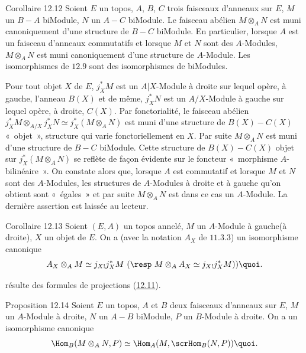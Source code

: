 \documentclass[10pt]{../fichiers-configuration-latex/smfart}
\begin{document}
\begin{enonce*}{Corollaire 12.12}
Soient $E$ un topos, $A$, $B$, $C$ trois faisceaux d'anneaux sur
$E$, $M$ un $B-A$ biModule, $N$ un $A-C$ biModule. Le faisceau
abélien $M\otimes_A N$ est muni canoniquement d'une structure de
$B-C$ biModule. En particulier, lorsque $A$ est un faisceau
d'anneaux commutatifs et lorsque $M$ et $N$ sont des $A$-Modules,
$M\otimes_AN$ est muni canoniquement d'une structure de $A$-Module.
Les isomorphismes de $\hyperref[IV.subsec12.9]{12.9}$ sont des isomorphismes de
biModules.
\end{enonce*}

Pour tout objet $X$ de $E$, $j^{\ast}_XM$ est un $A| X$-Module à
droite sur lequel opère, à gauche, l'anneau $B(X)$ et de même,
$j^{\ast}_XN$ est un $A/X$-Module à gauche sur lequel opère, à
droite, $C(X)$. Par fonctorialité, le faisceau abélien
$j^{\ast}_XM\otimes_{A/X} j^{\ast}_XN\simeq j^{\ast}_X (M\otimes_A
N)$ est muni d'une structure de $B(X)-C(X)$ « objet », structure
qui varie fonctoriellement en $X$. Par suite $M\otimes_A N$ est muni
d'une structure de $B-C$ biModule. Cette structure de $B(X)-C(X)$
objet sur $j^{\ast}_X(M\otimes_A N)$ se reflète de façon évidente
sur le foncteur « morphisme $A$-bilinéaire ». On constate alors
que, lorsque $A$ est commutatif et lorsque $M$ et $N$ sont des
$A$-Modules, les structures de $A$-Modules à droite et à gauche
qu'on obtient sont « égales »  et par suite $M\otimes_A N$ est
dans ce cas un $A$-Module. La dernière assertion est laissée au
lecteur.

\begin{enonce*}{Corollaire 12.13}
Soient $(E,A)$ un topos annelé, $M$ un $A$-Module à
gauche\pageoriginale (\resp à droite), $X$ un objet de $E$. On a
(avec la notation $A_X$ de $\hyperref[IV.prop11.3.3]{11.3.3}$) un isomorphisme
canonique
$$
A_X\otimes_AM\simeq j_{X!} j^{\ast}_XM\text{ (\resp } M\otimes_A
A_X\simeq j_{X!}j^{\ast}_XM)){\quoi}.
$$
\end{enonce*}

\noindent résulte des formules de projections (\hyperref[IV.prop12.11]{12.11}).

\begin{enonce*}{Proposition 12.14}
Soient $E$ un topos, $A$ et $B$ deux faisceaux d'anneaux sur $E$,
$M$ un $A$-Module à droite, $N$ un $A-B$ biModule, $P$ un $B$-Module
à droite. On a un isomorphisme canonique
$$
\Hom_B(M\otimes_A N,P)\simeq \Hom_A (M,\scrHom_B (N,P)){\quoi}.
$$
\end{enonce*}
\end{document}
